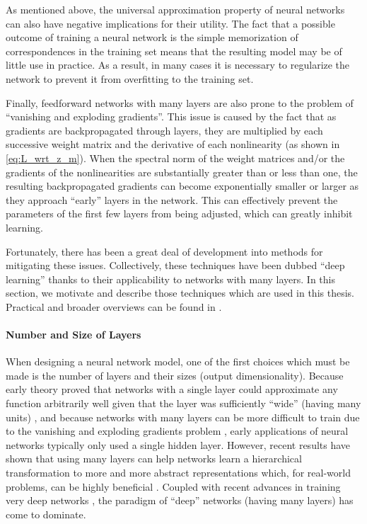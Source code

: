 As mentioned above, the universal approximation property of neural networks can also have negative implications for their utility.
The fact that a possible outcome of training a neural network is the simple memorization of correspondences in the training set means that the resulting model may be of little use in practice.
As a result, in many cases it is necessary to regularize the network to prevent it from overfitting to the training set.

Finally, feedforward networks with many layers are also prone to the problem of ``vanishing and exploding gradients''.
This issue is caused by the fact that as gradients are backpropagated through layers, they are multiplied by each successive weight matrix and the derivative of each nonlinearity (as shown in \cref{eq:L_wrt_z_m}).
When the spectral norm of the weight matrices and/or the gradients of the nonlinearities are substantially greater than or less than one, the resulting backpropagated gradients can become exponentially smaller or larger as they approach ``early'' layers in the network.
This can effectively prevent the parameters of the first few layers from being adjusted, which can greatly inhibit learning.

Fortunately, there has been a great deal of development into methods for mitigating these issues.
Collectively, these techniques have been dubbed ``deep learning'' thanks to their applicability to networks with many layers.
In this section, we motivate and describe those techniques which are used in this thesis.
Practical and broader overviews can be found in \cite{bengio2012practical, lecun2012efficient, lecun2015deep}.

\paragraph{Number and Size of Layers}

When designing a neural network model, one of the first choices which must be made is the number of layers and their sizes (output dimensionality).
Because early theory proved that networks with a single layer could approximate any function arbitrarily well given that the layer was sufficiently ``wide'' (having many units) \cite{cybenko1989approximation,hornik1989multilayer}, and because networks with many layers can be more difficult to train due to the vanishing and exploding gradients problem \cite{glorot2010understanding,erhan2009difficulty}, early applications of neural networks typically only used a single hidden layer.
However, recent results have shown that using many layers can help networks learn a hierarchical transformation to more and more abstract representations which, for real-world problems, can be highly beneficial \cite{bengio2009learning}.
Coupled with recent advances in training very deep networks \cite{glorot2011deep,glorot2010understanding,bengio2007greedy,hinton2006fast,hinton2012improving,hinton2006reducing,sutskever2013importance,ioffe2015batch,he2015delving,ciresan2010deep}, the paradigm of ``deep'' networks (having many layers) has come to dominate.

